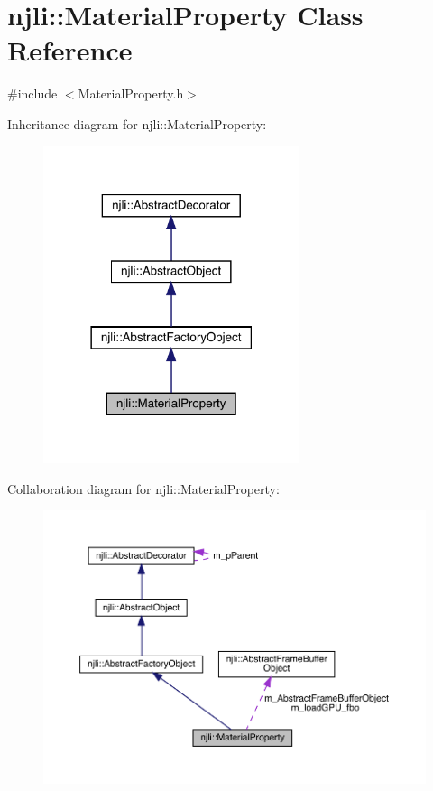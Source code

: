 \hypertarget{classnjli_1_1_material_property}{}\section{njli\+:\+:Material\+Property Class Reference}
\label{classnjli_1_1_material_property}


{\ttfamily \#include $<$Material\+Property.\+h$>$}



Inheritance diagram for njli\+:\+:Material\+Property\+:\nopagebreak
\begin{figure}[H]
\begin{center}
\leavevmode
\includegraphics[width=213pt]{classnjli_1_1_material_property__inherit__graph}
\end{center}
\end{figure}


Collaboration diagram for njli\+:\+:Material\+Property\+:\nopagebreak
\begin{figure}[H]
\begin{center}
\leavevmode
\includegraphics[width=350pt]{classnjli_1_1_material_property__coll__graph}
\end{center}
\end{figure}
